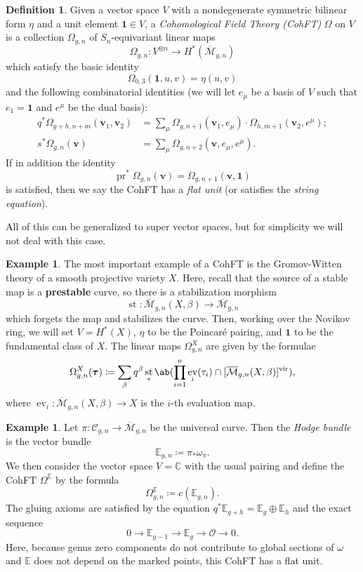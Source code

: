 \documentclass{amsart}
\theoremstyle{definition}
\newtheorem{defn}[thm]{Definition}
\newtheorem{exm}[thm]{Example}
\theoremstyle{remark}
\theoremstyle{plain}
\theoremstyle{definition}
\theoremstyle{remark}
\newcommand{\C}{\mathbb{C}}
\newcommand{\E}{\mathbb{E}}
\newcommand{\Mbar}{\overline{\mathcal{M}}}
\newcommand{\mc}[1]{\mathcal{#1}}
\newcommand{\mbf}[1]{\mathbf{#1}}
\newcommand{\bv}{\mbf{v}}
\newcommand{\btau}{\bm{\tau}}
\newcommand{\mr}[1]{\mathrm{#1}}
\newcommand{\1}{\mathbf{1}}
\newcommand{\2}{\mathbf{2}}
\newcommand{\3}{\mathbf{3}}
\newcommand{\vir}{\mr{vir}}
\DeclareMathOperator{\ev}{ev}
\DeclareMathOperator{\st}{st}
\DeclareMathOperator{\pr}{pr}
\begin{document}
\begin{defn}
    Given a vector space $V$ with a nondegenerate symmetric bilinear form $\eta$ and a unit element $\1 \in V$, a \textit{Cohomological Field Theory (CohFT)} $\Omega$ on $V$ is a collection $\Omega_{g,n}$ of $S_n$-equivariant linear maps
    \[ \Omega_{g,n} \colon V^{\otimes n} \to H^*(\Mbar_{g,n}) \]
    which satisfy the basic identity
    \[ \Omega_{0,3}(\1, u,v) = \eta(u,v) \]
    and the following combinatorial identities (we will let $e_{\mu}$ be a basis of $V$ such that $e_1 = \1$ and $e^{\mu}$ be the dual basis):
    \begin{align*}
        q^* \Omega_{g+h,n+m}(\bv_1, \bv_2) &= \sum_{\mu} \Omega_{g,n+1}(\bv_1, e_{\mu}) \cdot \Omega_{h,m+1}(  \bv_2, e^{\mu} ); \\
        s^* \Omega_{g,n}(\bv) &= \sum_{\mu} \Omega_{g,n+2}(\bv, e_{\mu}, e^{\mu}).
    \end{align*}
    If in addition the identity
    \[ \pr^*\Omega_{g,n}(\bv) = \Omega_{g,n+1}(\bv,\1) \]
    is satisfied, then we say the CohFT has a \textit{flat unit} (or satisfies the \textit{string equation}).
\end{defn}
All of this can be generalized to super vector spaces, but for simplicity we will not deal with this case.

\begin{exm}
    The most important example of a CohFT is the Gromov-Witten theory of a smooth projective variety $X$. Here, recall that the source of a stable map is a \textbf{prestable} curve, so there is a stabilization morphism
    \[ \st \colon \Mbar_{g,n}(X,\beta) \to \Mbar_{g,n} \]
    which forgets the map and stabilizes the curve. Then, working over the Novikov ring, we will set $V = H^*(X)$, $\eta$ to be the Poincar\'e pairing, and $\1$ to be the fundamental class of $X$. The linear maps $\Omega^X_{g,n}$ are given by the formulae
    \[ \Omega_{g,n}^X(\btau) \coloneqq \sum_{\beta} q^{\beta} \st_* \ab(\prod_{i=1}^n \ev_i(\tau_i) \cap [\Mbar_{g,n}(X,\beta)]^{\vir}), \]
    where $\ev_i \colon \Mbar_{g,n}(X,\beta) \to X$ is the $i$-th evaluation map.
\end{exm}

\begin{exm}
    Let $\pi \colon \mc{C}_{g,n} \to \Mbar_{g,n}$ be the universal curve. Then the \textit{Hodge bundle} is the vector bundle 
    \[ \E_{g,n} \coloneqq \pi_* \omega_{\pi}. \]
    We then consider the vector space $V = \C$ with the usual pairing and define the CohFT $\Omega^{\E}$ by the formula
    \[ \Omega^{\E}_{g,n} \coloneqq c(\E_{g,n}). \]
    The gluing axioms are satisfied by the equation $q^* \E_{g+h} = \E_g \oplus \E_h$ and the exact sequence
    \[ 0 \to \E_{g-1} \to \E_g \to \mc{O} \to 0. \]
    Here, because genus zero components do not contribute to global sections of $\omega$ and $\E$ does not depend on the marked points, this CohFT has a flat unit.
\end{exm}
\end{document}
